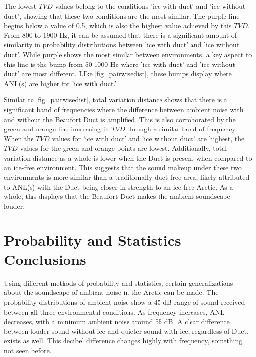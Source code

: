 The lowest $TVD$ values belong to the conditions 'ice with duct' and 'ice without duct', showing that these two conditions are the most similar. The purple line begins below a value of 0.5, which is also the highest value achieved by this $TVD$. From 800 to 1900 Hz, it can be assumed that there is a significant amount of similarity in probability distributions between 'ice with duct' and 'ice without duct'. While purple shows the most similar between environments, a key aspect to this line is the bump from 50-1000 Hz where 'ice with duct' and 'ice without duct' are most different. LIke \autoref{fig_pairwisedist}, these bumps display where ANL(s) are higher for 'ice with duct.'


Similar to \autoref{fig_pairwisedist}, total variation distance shows that there is a significant band of frequencies where the difference between ambient noise with and without the Beaufort Duct is amplified. This is also corroborated by the green and orange line increasing in $TVD$ through a similar band of frequency. When the $TVD$ values for 'ice with duct' and 'ice without duct' are highest, the $TVD$ values for the green and orange points are lowest. Additionally, total variation distance as a whole is lower when the Duct is present when compared to an ice-free environment. This suggests that the sound makeup under these two environments is more similar than a traditionally duct-free area, likely attributed to ANL(s) with the Duct being closer in strength to an ice-free Arctic. As a whole, this displays that the Beaufort Duct makes the ambient soundscape louder.




\section{Probability and Statistics Conclusions}
Using different methods of probability and statistics, certain generalizations about the soundscape of ambient noise in the Arctic can be made. The probability distributions of ambient noise show a 45 dB range of sound received between all three environmental conditions. As frequency increases, ANL decreases, with a minimum ambient noise around 55 dB. A clear difference between louder sound without ice and quieter sound with ice, regardless of Duct, exists as well. This decibel difference changes highly with frequency, something not seen before.

